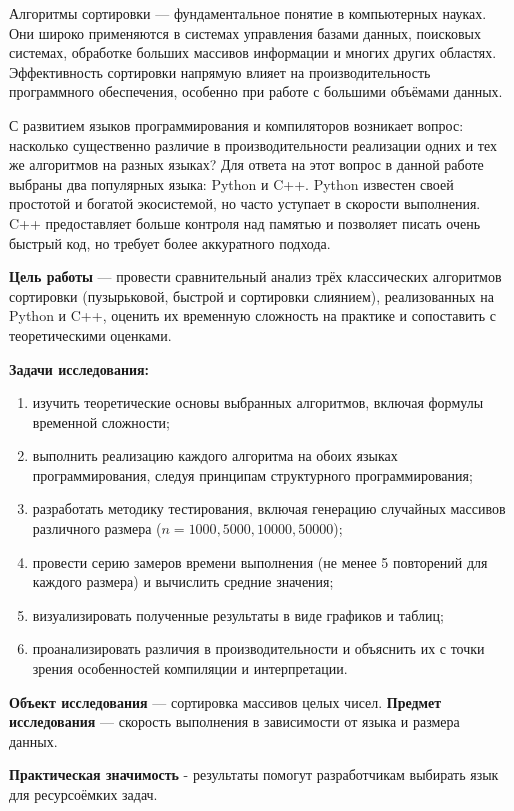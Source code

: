 Алгоритмы сортировки — фундаментальное понятие в компьютерных науках. Они широко применяются в системах управления базами данных, поисковых системах, обработке больших массивов информации и многих других областях. Эффективность сортировки напрямую влияет на производительность программного обеспечения, особенно при работе с большими объёмами данных.

С развитием языков программирования и компиляторов возникает вопрос: насколько существенно различие в производительности реализации одних и тех же алгоритмов на разных языках? Для ответа на этот вопрос в данной работе выбраны два популярных языка:  Python и C++. Python известен своей простотой и богатой экосистемой, но часто уступает в скорости выполнения. C++ предоставляет больше контроля над памятью и позволяет писать очень быстрый код, но требует более аккуратного подхода.

\textbf{Цель работы} — провести сравнительный анализ трёх классических алгоритмов сортировки (пузырьковой, быстрой и сортировки слиянием), реализованных на Python и C++, оценить их временную сложность на практике и сопоставить с теоретическими оценками.

\textbf{Задачи исследования:}
\begin{enumerate}
    \item изучить теоретические основы выбранных алгоритмов, включая формулы временной сложности;
    \item выполнить реализацию каждого алгоритма на обоих языках программирования, следуя принципам структурного программирования;
    \item разработать методику тестирования, включая генерацию случайных массивов различного размера ($n = 1000, 5000, 10000, 50000$);
    \item провести серию замеров времени выполнения (не менее 5 повторений для каждого размера) и вычислить средние значения;
    \item визуализировать полученные результаты в виде графиков и таблиц;
    \item проанализировать различия в производительности и объяснить их с точки зрения особенностей компиляции и интерпретации.
\end{enumerate}

\textbf{Объект исследования} — сортировка массивов целых чисел. 
\textbf{Предмет исследования} — скорость выполнения в зависимости от языка и размера данных.

\textbf{Практическая значимость} - результаты помогут разработчикам выбирать язык для ресурсоёмких задач. \cite{knuth1998, cormen2009, python_sort}